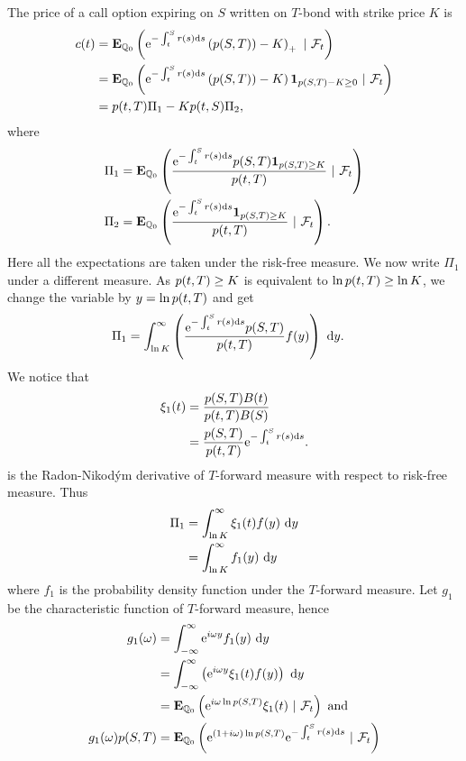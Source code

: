 The price of a call option expiring on $S$ written on $T$-bond with strike price $K$ is
	\begin{align}
		c(t) &= \operatorname{\boldsymbol{\mathrm{E}}}_{\mathbb{Q}_0} \left( \mathrm{e}^{ - \int_t^S r(s) \mathrm{d} s } \left( p(S,T)) - K \right)_+ \ | \ \mathcal{F}_t \right) \\
			&= \operatorname{\boldsymbol{\mathrm{E}}}_{\mathbb{Q}_0} \left( \mathrm{e}^{ - \int_t^S r(s) \mathrm{d} s } \left( p(S,T)) - K \right) \boldsymbol{1}_{ p(S,T) - K \geq 0 } \ | \ \mathcal{F}_t \right) \\
			&= p(t,T) \Pi_1 - K p(t,S) \Pi_2 ,
	\end{align}
where
	\begin{align}
		\Pi_1 &= \operatorname{\boldsymbol{\mathrm{E}}}_{\mathbb{Q}_0} \left( \frac{\mathrm{e}^{ - \int_t^S r(s) \mathrm{d} s } p(S,T) \boldsymbol{1}_{ p(S,T) \geq K }}{p(t,T)} \ | \ \mathcal{F}_t \right) \\
		\Pi_2 &= \operatorname{\boldsymbol{\mathrm{E}}}_{\mathbb{Q}_0} \left( \frac{\mathrm{e}^{ - \int_t^S r(s) \mathrm{d} s } \boldsymbol{1}_{ p(S,T) \geq K }}{p(t,T)} \ | \ \mathcal{F}_t \right) .
	\end{align}
Here all the expectations are taken under the risk-free measure. We now write $\Pi_1$ under a different measure. As $p(t,T) \geq K$ is equivalent to $\ln p(t,T) \geq  \ln K$, we change the variable by $y = \ln p(t,T)$ and get
	\begin{align}
		\label{fourierchangeofvariable}
		\Pi_1 &= \int_{\ln K}^{\infty} \left( \frac{\mathrm{e}^{ - \int_t^S r(s) \mathrm{d} s } p(S,T) }{p(t,T)} f(y) \right) \ \mathrm{d} y .
	\end{align}
We notice that 
	\begin{align}
		\xi_1 (t) &= \frac{p(S,T) B(t)}{p(t,T) B(S)} \\
		&= \frac{ p(S,T) }{p(t,T)} \mathrm{e}^{ - \int_t^S r(s) \mathrm{d} s } .
\end{align}
is the Radon-Nikod\'{y}m derivative of $T$-forward measure with respect to risk-free measure. Thus
	\begin{align}
		\Pi_1 &= \int_{\ln K}^{\infty} \xi_1(t) f(y) \ \mathrm{d} y \\
			&= \int_{\ln K}^{\infty} f_1(y) \ \mathrm{d} y
\end{align}
where $f_1$ is the probability density function under the $T$-forward measure. Let $g_1$ be the characteristic function of $T$-forward measure, hence 
	\begin{align}
		g_1 (\omega) &= \int_{-\infty}^{\infty} \mathrm{e}^{i\omega y} f_1(y) \ \mathrm{d} y \\
			&= \int_{-\infty}^{\infty} \left( \mathrm{e}^{i\omega y} \xi_1(t) f(y) \right) \ \mathrm{d} y \\
			&= \operatorname{\boldsymbol{\mathrm{E}}}_{\mathbb{Q}_0} \left( \mathrm{e}^{i\omega \ln p(S,T)} \xi_1(t)  \ | \ \mathcal{F}_t \right) \text{ and } \\
		g_1 (\omega) p(S,T) &= \operatorname{\boldsymbol{\mathrm{E}}}_{\mathbb{Q}_0} \left( \mathrm{e}^{(1+i\omega) \ln p(S,T)} \mathrm{e}^{ - \int_t^S r(s) \mathrm{d} s } \ | \ \mathcal{F}_t \right)
	\end{align}
